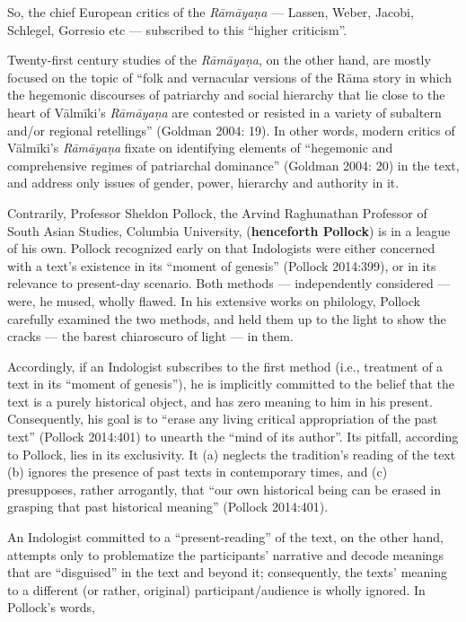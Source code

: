 So, the chief European critics of the {\sl Rāmāyaṇa} — Lassen, Weber, Jacobi, Schlegel, Gorresio etc --- subscribed to this “higher criticism”. 

Twenty-first century studies of the {\sl Rāmāyaṇa}, on the other hand, are mostly focused on the topic of “folk and vernacular versions of the Rāma story in which the hegemonic discourses of patriarchy and social hierarchy that lie close to the heart of Vālmīki’s {\sl Rāmāyaṇa} are contested or resisted in a variety of subaltern and/or regional retellings” (Goldman 2004: 19). In other words, modern critics of Vālmīki’s {\sl Rāmāyaṇa} fixate on identifying elements of “hegemonic and comprehensive regimes of patriarchal dominance” (Goldman 2004: 20) in the text, and address only issues of gender, power, hierarchy and authority in it.  

Contrarily, Professor Sheldon Pollock, the Arvind Raghunathan Professor of South Asian Studies, Columbia University, ({\bf henceforth Pollock}) is in a league of his own. Pollock recognized early on that Indologists were either concerned with a text’s existence in its “moment of genesis” (Pollock 2014:399), or in its relevance to present-day scenario. Both methods --- independently considered --- were, he mused, wholly flawed. In his extensive works on philology, Pollock carefully examined the two methods, and held them up to the light to show the cracks --- the barest chiaroscuro of light --- in them.

Accordingly, if an Indologist subscribes to the first method (i.e., treatment of a text in its “moment of genesis”), he is implicitly committed to the belief that the text is a purely historical object, and has zero meaning to him in his present. Consequently, his goal is to “erase any living critical appropriation of the past text” (Pollock 2014:401) to unearth the “mind of its author”. Its pitfall, according to Pollock, lies in its exclusivity. It (a) neglects the tradition’s reading of the text (b) ignores the presence of past texts in contemporary times, and (c) presupposes, rather arrogantly, that “our own historical being can be erased in grasping that past historical meaning” (Pollock 2014:401). 

\newpage

An Indologist committed to a “present-reading” of the text, on the other hand, attempts only to problematize the participants’ narrative and decode meanings that are “disguised” in the text and beyond it; consequently, the texts’ meaning to a different (or rather, original) participant/audience is wholly ignored. In Pollock’s words, 

